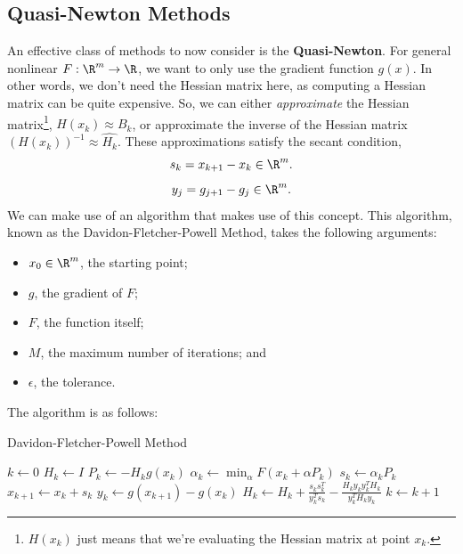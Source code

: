 \documentclass[letterpaper]{article}
\begin{document}
\subsection{Quasi-Newton Methods}
An effective class of methods to now consider is the \textbf{Quasi-Newton}. For general nonlinear $F: \R^m \to \R$, we want to only use the gradient function $g(x)$. In other words, we don't need the Hessian matrix here, as computing a Hessian matrix can be quite expensive. So, we can either \emph{approximate} the Hessian matrix\footnote{$H(x_k)$ just means that we're evaluating the Hessian matrix at point $x_k$.}, $H(x_k) \approx B_k$, or approximate the inverse of the Hessian matrix $(H(x_k))^{-1} \approx \hat{H_k}$. These approximations satisfy the secant condition, \[s_k = x_{k + 1} - x_k \in \R^m.\] \[y_j = g_{j + 1} - g_j \in \R^m.\]
We can make use of an algorithm that makes use of this concept. This algorithm, known as the Davidon-Fletcher-Powell Method, takes the following arguments: 
\begin{itemize}
    \item $x_0 \in \R^m$, the starting point; 
    \item $g$, the gradient of $F$; 
    \item $F$, the function itself;
    \item $M$, the maximum number of iterations; and  
    \item $\epsilon$, the tolerance.
\end{itemize}
The algorithm is as follows:
\begin{algorithm}[H]
    \caption{Davidon-Fletcher-Powell Method}
    \begin{algorithmic}[1]
            \State $k \gets 0$
            \State $H_k \gets I$
                \State $P_k \gets -H_k g(x_k)$
                \State $\alpha_k \gets \min_{\alpha} F(x_k + \alpha P_k)$ 
                \State $s_k \gets \alpha_k P_k$ 
                \State $x_{k + 1} \gets x_k + s_k$ 
                \State $y_k \gets g(x_{k + 1}) - g(x_k)$
                \State $H_k \gets H_k + \frac{s_k s_k^T}{y_k^T s_k} - \frac{H_k y_k y_k^T H_k}{y_k^T H_k y_k}$
                \State $k \gets k + 1$
            \EndWhile 
        \EndFunction
    \end{algorithmic}
\end{algorithm}
\end{document}
